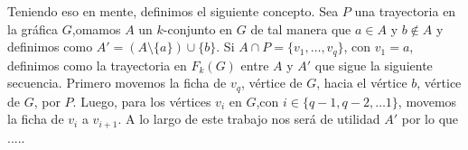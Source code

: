 Teniendo eso en mente, definimos el siguiente concepto. Sea $P$ una trayectoria
en la gr\'afica $G$,omamos $A$ un $k$-conjunto en $G$ de tal manera que $a\in A$
y $b \notin A$ y definimos  como $A'= (A \setminus
\{a\}) \cup \{b\}$. Si $A\cap P =\{v_1, \dots, v_q\}$, con $v_1 = a$, definimos
 como la trayectoria en $F_k(G)$ entre $A$ y $A'$ que
sigue la siguiente secuencia. Primero movemos la ficha de $v_q$, v\'ertice de
$G$, hacia el v\'ertice $b$, v\'ertice de $G$, por $P$. Luego, para los
v\'ertices $v_i$ en $G$,con $i \in \{q-1, q-2, \dots 1\}$, movemos la ficha de
$v_i$ a $v_{i+1}$. A lo largo de este trabajo nos ser\'a de utilidad $A'$ por lo
que .....